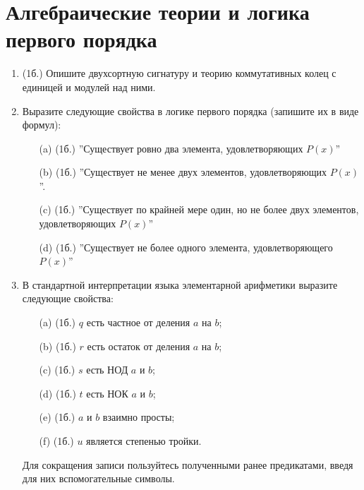\section{Алгебраические теории и логика первого порядка}
\begin{enumerate}
    \item (1б.) Опишите двухсортную сигнатуру и теорию коммутативных колец с единицей и модулей над ними.
    \item Выразите следующие свойства в логике первого порядка (запишите их в виде формул):
    \begin{itemize}
        \item[(a)] (1б.) ”Существует ровно два элемента, удовлетворяющих $P(x)$”
        \item[(b)] (1б.) ”Существует не менее двух элементов, удовлетворяющих $P(x)$”.
        \item[(c)] (1б.) ”Существует по крайней мере один, но не более двух элементов, удовлетворяющих $P(x)$”
        \item[(d)] (1б.) ”Существует не более одного элемента, удовлетворяющего $P(x)$”
    \end{itemize}
    \item В стандартной интерпретации языка элементарной арифметики выразите следующие свойства:
    \begin{itemize}
        \item[(a)] (1б.) $q$ есть частное от деления $a$ на $b$;
        \item[(b)] (1б.) $r$ есть остаток от деления $a$ на $b$;
        \item[(c)] (1б.) $s$ есть НОД $a$ и $b$;
        \item[(d)] (1б.) $t$ есть НОК $a$ и $b$;
        \item[(e)] (1б.) $a$ и $b$ взаимно просты;
        \item[(f)] (1б.) $u$ является степенью тройки.
    \end{itemize}
    Для сокращения записи пользуйтесь полученными ранее предикатами, введя для них вспомогательные символы.
    
\end{enumerate}
\clearpage
